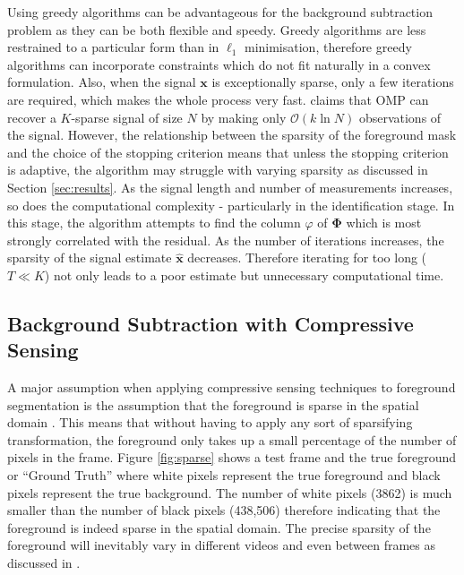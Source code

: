 Using greedy algorithms can be advantageous for the background subtraction problem as they can be both flexible and speedy. Greedy algorithms are less restrained to a particular form than in $\ell_1$ minimisation, therefore greedy algorithms can incorporate constraints which do not fit naturally in a convex formulation. Also, when the signal $\boldsymbol{x}$ is exceptionally sparse, only a few iterations are required, which makes the whole process very fast. \cite{Tropp2007} claims that OMP can recover a $K$-sparse signal of size $N$ by making only $\mathcal{O}(k \ln N)$ observations of the signal. However, the relationship between the sparsity of the foreground mask and the choice of the stopping criterion means that unless the stopping criterion is adaptive, the algorithm may struggle with varying sparsity as discussed in Section \ref{sec:results}. As the signal length and number of measurements increases, so does the computational complexity - particularly in the identification stage. In this stage, the algorithm attempts to find the column $\varphi$ of $\boldsymbol{\Phi}$ which is most strongly correlated with the residual. As the number of iterations increases, the sparsity of the signal estimate $\boldsymbol{\hat{x}}$ decreases. Therefore iterating for too long ($T \ll K$) not only leads to a poor estimate but unnecessary computational time. 

  

\subsection{Background Subtraction with Compressive Sensing}
\label{sec:backgr-subtr-with}

A major assumption when applying compressive sensing techniques to foreground segmentation is the assumption that the foreground is sparse in the spatial domain  \citep{Cevher2008b}. This means that without having to apply any sort of sparsifying transformation, the foreground only takes up a small percentage of the number of pixels in the frame. Figure \ref{fig:sparse} shows a test frame and the true foreground or ``Ground Truth'' where white pixels represent the true foreground and black pixels represent the true background. The number of white pixels (3862) is much smaller than the number of black pixels (438,506) therefore indicating that the foreground is indeed sparse in the spatial domain. The precise sparsity of the foreground will inevitably vary in different  videos and even between frames as discussed in \cite{Warnell2011}. 

